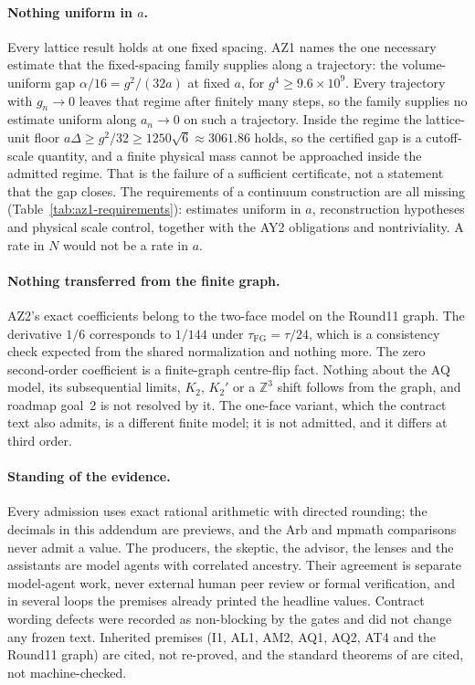\paragraph{Nothing uniform in \texorpdfstring{$a$}{a}.}
Every lattice result holds at one fixed spacing. AZ1 names the one necessary
estimate that the fixed-spacing family supplies along a trajectory: the
volume-uniform gap $\alpha/16=g^2/(32a)$ at fixed $a$, for
$g^4\ge9.6\times10^9$. Every trajectory with $g_n\to0$ leaves that regime
after finitely many steps, so the family supplies no estimate uniform along
$a_n\to0$ on such a trajectory. Inside the regime the lattice-unit floor
$a\Delta\ge g^2/32\ge1250\sqrt6\approx3061.86$ holds, so the certified gap is
a cutoff-scale quantity, and a finite physical mass cannot be approached
inside the admitted regime. That is the failure of a sufficient certificate,
not a statement that the gap closes. The requirements of a continuum
construction are all missing (Table~\ref{tab:az1-requirements}): estimates
uniform in $a$, reconstruction hypotheses and physical scale control,
together with the AY2 obligations and nontriviality. A rate in $N$ would not
be a rate in $a$.

\paragraph{Nothing transferred from the finite graph.}
AZ2's exact coefficients belong to the two-face model on the Round11 graph.
The derivative $1/6$ corresponds to $1/144$ under $\tau_{\mathrm{FG}}=\tau/24$, which is a
consistency check expected from the shared normalization and nothing more.
The zero second-order coefficient is a finite-graph centre-flip fact. Nothing
about the AQ model, its subsequential limits, $K_2$, $K_2'$ or a $\mathbb Z^3$
shift follows from the graph, and roadmap goal~2 is not resolved by it. The
one-face variant, which the contract text also admits, is a different finite
model; it is not admitted, and it differs at third order.

\paragraph{Standing of the evidence.}
Every admission uses exact rational arithmetic with directed rounding; the
decimals in this addendum are previews, and the Arb and mpmath comparisons
never admit a value. The producers, the skeptic, the advisor, the lenses and
the assistants are model agents with correlated ancestry. Their agreement is
separate model-agent work, never external human peer review or formal
verification, and in several loops the premises already printed the headline
values. Contract wording defects were recorded as non-blocking by the gates
and did not change any frozen text. Inherited premises (I1, AL1,
AM2, AQ1, AQ2, AT4 and the Round11 graph) are cited, not re-proved, and the
standard theorems of \cite{standard} are cited, not machine-checked.

